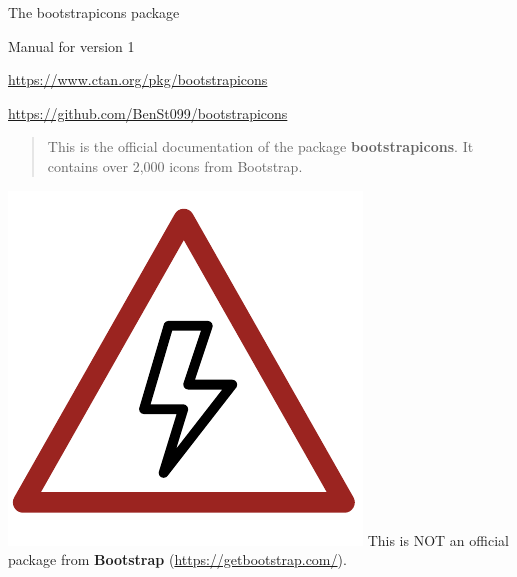\documentclass{article}
\begin{document}
\newpage
\thispagestyle{empty}
\begin{center}
    \begin{tcolorbox}[colback=white,colframe=gray-700, width=7cm,halign=center,boxrule=0.2mm]
        {\Large The {\sffamily bootstrapicons} package}

        Manual for version 1
    \end{tcolorbox}\vspace{15mm}

    \href{https://www.ctan.org/pkg/bootstrapicons}{\textcolor{blue-700}{https://www.ctan.org/pkg/bootstrapicons}}\vspace{6mm}

    \href{https://github.com/BenSt099/bootstrapicons}{\textcolor{blue-700}{https://github.com/BenSt099/bootstrapicons}}
\end{center}\vspace{7mm}

\begin{abstract}
\noindent This is the official documentation of the package \textbf{bootstrapicons}. It contains over 2,000 icons from Bootstrap. 
\end{abstract}\vspace{10mm}

\begin{tcolorbox}[leftrule=3mm,colback=red-200,colframe=red-800,lower separated=false,sidebyside,lefthand width=1.5cm]
    \includegraphics[scale=0.25]{danger.pdf}\tcblower {\bf\textcolor{red-800}{ATTENTION!}} This is NOT an official package from \textbf{Bootstrap} (\href{https://getbootstrap.com/}{\textcolor{blue-700}{https://getbootstrap.com/}}).
\end{tcolorbox}
\end{document}
